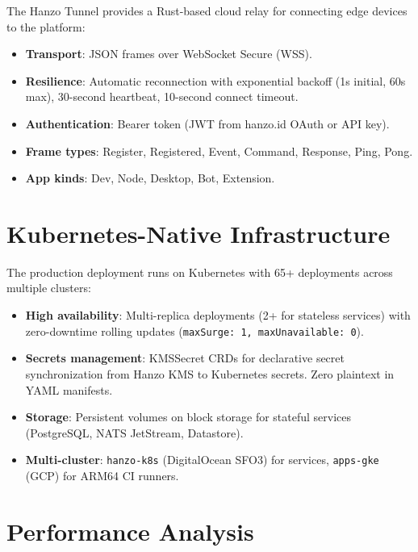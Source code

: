 \documentclass[11pt,letterpaper]{article}
\begin{document}
The Hanzo Tunnel provides a Rust-based cloud relay for connecting edge devices to the platform:

\begin{itemize}
\item \textbf{Transport}: JSON frames over WebSocket Secure (WSS).
\item \textbf{Resilience}: Automatic reconnection with exponential backoff (1s initial, 60s max), 30-second heartbeat, 10-second connect timeout.
\item \textbf{Authentication}: Bearer token (JWT from hanzo.id OAuth or API key).
\item \textbf{Frame types}: Register, Registered, Event, Command, Response, Ping, Pong.
\item \textbf{App kinds}: Dev, Node, Desktop, Bot, Extension.
\end{itemize}

\section{Kubernetes-Native Infrastructure}

The production deployment runs on Kubernetes with 65+ deployments across multiple clusters:

\begin{itemize}
\item \textbf{High availability}: Multi-replica deployments (2+ for stateless services) with zero-downtime rolling updates (\texttt{maxSurge: 1, maxUnavailable: 0}).
\item \textbf{Secrets management}: KMSSecret CRDs for declarative secret synchronization from Hanzo KMS to Kubernetes secrets. Zero plaintext in YAML manifests.
\item \textbf{Storage}: Persistent volumes on block storage for stateful services (PostgreSQL, NATS JetStream, Datastore).
\item \textbf{Multi-cluster}: \texttt{hanzo-k8s} (DigitalOcean SFO3) for services, \texttt{apps-gke} (GCP) for ARM64 CI runners.
\end{itemize}

\section{Performance Analysis}
\end{document}
